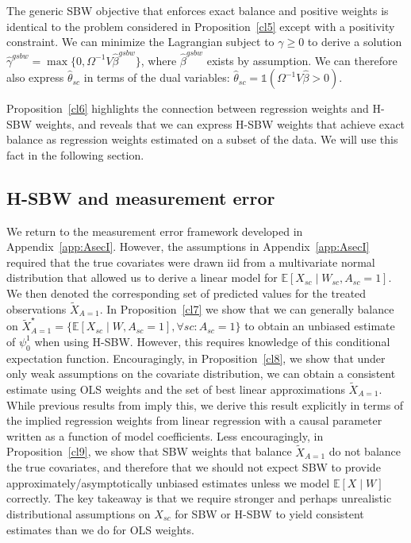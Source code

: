 \begin{remark}
    The generic SBW objective that enforces exact balance and positive weights is identical to the problem considered in Proposition~\ref{cl5} except with a positivity constraint. We can minimize the Lagrangian subject to $\gamma \ge 0$ to derive a solution $\hat{\gamma}^{gsbw} = \max\{0, \Omega^{-1}V\hat{\beta}^{gsbw}\}$, where $\hat{\beta}^{gsbw}$ exists by assumption. We can therefore also express $\hat{\theta}_{sc}$ in terms of the dual variables: $\hat{\theta}_{sc} = \mathds{1}(\Omega^{-1}V\hat{\beta} > 0)$.
\end{remark}

Proposition~\ref{cl6} highlights the connection between regression weights and H-SBW weights, and reveals that we can express H-SBW weights that achieve exact balance as regression weights estimated on a subset of the data. We will use this fact in the following section. 

\subsection{H-SBW and measurement error}\label{app:AsecIII}

We return to the measurement error framework developed in Appendix~\ref{app:AsecI}. However, the assumptions in Appendix~\ref{app:AsecI} required that the true covariates were drawn iid from a multivariate normal distribution that allowed us to derive a linear model for $\mathbb{E}[X_{sc} \mid W_{sc}, A_{sc} = 1]$. We then denoted the corresponding set of predicted values for the treated observations $\tilde{X}_{A=1}$. In Proposition~\ref{cl7} we show that we can generally balance on $\tilde{X}^\star_{A=1} = \{\mathbb{E}[X_{sc} \mid W, A_{sc} = 1], \forall sc: A_{sc} = 1\}$ to obtain an unbiased estimate of $\psi_0^1$ when using H-SBW. However, this requires knowledge of this conditional expectation function. Encouragingly, in Proposition~\ref{cl8}, we show that under only weak assumptions on the covariate distribution, we can obtain a consistent estimate using OLS weights and the set of best linear approximations $\tilde{X}_{A=1}$. While previous results from \cite{gleser1992importance} imply this, we derive this result explicitly in terms of the implied regression weights from linear regression with a causal parameter written as a function of model coefficients. Less encouragingly, in Proposition~\ref{cl9}, we show that SBW weights that balance $\tilde{X}_{A=1}$ do not balance the true covariates, and therefore that we should not expect SBW to provide approximately/asymptotically unbiased estimates unless we model $\mathbb{E}[X \mid W]$ correctly. The key takeaway is that we require stronger and perhaps unrealistic distributional assumptions on $X_{sc}$ for SBW or H-SBW to yield consistent estimates than we do for OLS weights. 

